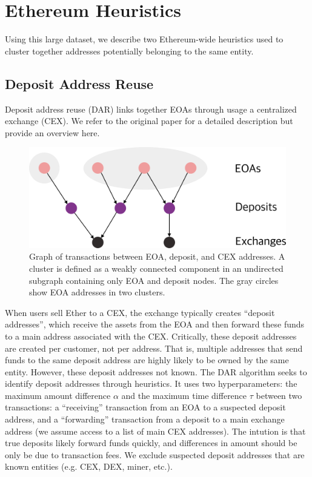 \documentclass[11pt,a4paper]{article}
\begin{document}
\section{Ethereum Heuristics}
\label{sec:eth}

Using this large dataset, we describe two Ethereum-wide heuristics used to cluster together addresses potentially belonging to the same entity.

\subsection{Deposit Address Reuse}
\label{sec:dar}

Deposit address reuse (DAR) links together EOAs through usage a centralized exchange (CEX). We refer to the original paper \citep{victor2020address} for a detailed description but provide an overview here.

\begin{figure}[b!]
\includegraphics[width=\linewidth]{figures/dar.pdf}
\caption{Graph of transactions between EOA, deposit, and CEX addresses. A cluster is defined as a weakly connected component in an undirected subgraph containing only EOA and deposit nodes. The gray circles show EOA addresses in two clusters.}
\label{fig:dar}
\end{figure}

When users sell Ether to a CEX, the exchange typically creates ``deposit addresses'', which receive the assets from the EOA and then forward these funds to a main address associated with the CEX. Critically, these deposit addresses are created per customer, not per address. That is, multiple addresses that send funds to the same deposit address are highly likely to be owned by the same entity. However, these deposit addresses not known. The DAR algorithm seeks to identify deposit addresses through heuristics.
It uses two hyperparameters: the maximum amount difference $\alpha$ and the maximum time difference $\tau$ between two transactions: a ``receiving'' transaction from an EOA to a suspected deposit address, and a ``forwarding'' transaction from a deposit to a main exchange address (we assume access to a list of main CEX addresses). The intution is that true deposits likely forward funds quickly, and differences in amount should be only be due to transaction fees. We exclude suspected deposit addresses that are known entities (e.g. CEX, DEX, miner, etc.).
\end{document}
